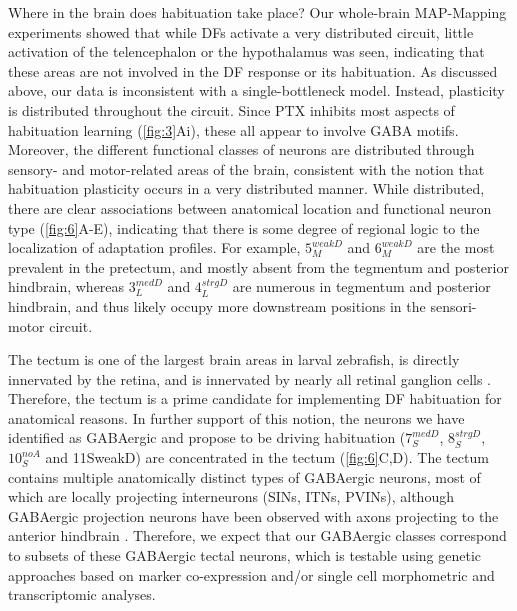 \documentclass[9pt,lineno]{RandlettLab_elife}
\begin{document}
Where in the brain does habituation take place?  Our whole-brain MAP-Mapping experiments showed that while DFs activate a very distributed circuit, little activation of the telencephalon or the hypothalamus was seen, indicating that these areas are not involved in the DF response or its habituation.  As discussed above, our data is inconsistent with a single-bottleneck model. Instead, plasticity is distributed throughout the circuit. Since PTX inhibits most aspects of habituation learning (\autoref{fig:3}Ai), these all appear to involve GABA motifs. Moreover, the different functional classes of neurons are distributed through sensory- and motor-related areas of the brain, consistent with the notion that habituation plasticity occurs in a very distributed manner. While distributed, there are clear associations between anatomical location and functional neuron type (\autoref{fig:6}A-E), indicating that there is some degree of regional logic to the localization of adaptation profiles. For example, $5_{M}^{weakD}$ and $6_{M}^{weakD}$ are the most prevalent in the pretectum, and mostly absent from the tegmentum and posterior hindbrain, whereas $3_{L}^{medD}$ and $4_{L}^{strgD}$ are numerous in tegmentum and posterior hindbrain, and thus likely occupy more downstream positions in the sensori-motor circuit. 

The tectum is one of the largest brain areas in larval zebrafish, is directly innervated by the retina, and is innervated by nearly all retinal ganglion cells \cite{Robles2014-kz}. Therefore, the tectum is a prime candidate for implementing DF habituation for anatomical reasons. In further support of this notion, the neurons we have identified as GABAergic and propose to be driving habituation ($7_{S}^{medD}$, $8_{S}^{strgD}$,  $10_{S}^{noA}$ and 11SweakD) are concentrated in the tectum (\autoref{fig:6}C,D). The tectum contains multiple anatomically distinct types of GABAergic neurons, most of which are locally projecting interneurons (SINs, ITNs, PVINs), although GABAergic projection neurons have been observed with axons projecting to the anterior hindbrain \cite{Gebhardt2019-xd, Martin2022-iz, Nevin2010-ev, Robles2011-ty}. Therefore, we expect that our GABAergic classes correspond to subsets of these GABAergic tectal neurons, which is testable using genetic approaches based on marker co-expression and/or single cell morphometric and transcriptomic analyses.
\end{document}
